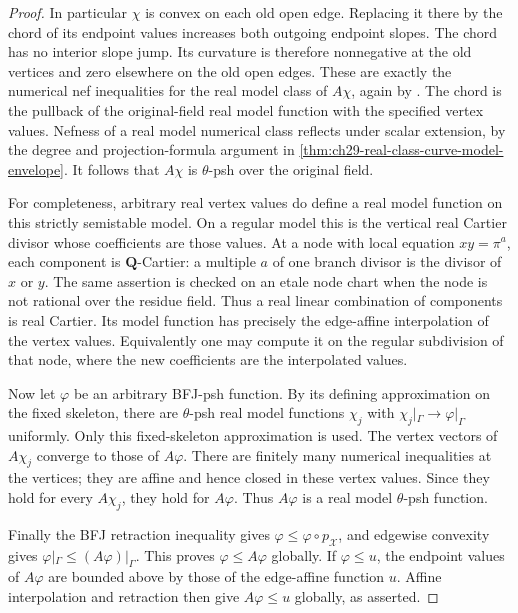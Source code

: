 \begin{proof}
In particular \(\chi\) is convex on each old open edge.  Replacing
it there by the chord of its endpoint values increases both outgoing
endpoint slopes.  The chord has no interior slope jump.  Its
curvature is therefore nonnegative at the old vertices and zero
elsewhere on the old open edges.  These are exactly the numerical
nef inequalities for the real model class of \(A\chi\), again by
\cite[Proposition~3.7]{GJKM19}.  The chord is the pullback of the
original-field real model function with the specified vertex values.
Nefness of a real model numerical class reflects under scalar
extension, by the degree and projection-formula argument in
\cref{thm:ch29-real-class-curve-model-envelope}.  It follows that
\(A\chi\) is \(\theta\)-psh over the original field.

For completeness, arbitrary real vertex values do define a real
model function on this strictly semistable model.  On a regular
model this is the vertical real Cartier divisor whose coefficients
are those values.  At a node with local equation \(xy=\pi^a\),
each component is \(\mathbf Q\)-Cartier: a multiple \(a\) of
one branch divisor is the divisor of \(x\) or \(y\).
The same assertion is checked on an etale node chart when the node
is not rational over the residue field.  Thus a real linear
combination of components is real Cartier.  Its model function
has precisely the edge-affine interpolation of the vertex values.
Equivalently one may compute it on the regular subdivision of that
node, where the new coefficients are the interpolated values.

Now let \(\varphi\) be an arbitrary BFJ-psh function.  By its
defining approximation on the fixed skeleton, there are
\(\theta\)-psh real model functions \(\chi_j\) with
\(\chi_j|_\Gamma\to\varphi|_\Gamma\) uniformly.  Only this
fixed-skeleton approximation is used.  The vertex vectors of
\(A\chi_j\) converge to those of \(A\varphi\).
There are finitely many numerical inequalities at the vertices;
they are affine and hence closed in these vertex values.  Since
they hold for every \(A\chi_j\), they hold for \(A\varphi\).
Thus \(A\varphi\) is a real model \(\theta\)-psh function.

Finally the BFJ retraction inequality gives
\(\varphi\leq\varphi\circ p_{\mathcal X}\), and edgewise
convexity gives \(\varphi|_\Gamma\leq(A\varphi)|_\Gamma\).
This proves \(\varphi\leq A\varphi\) globally.  If
\(\varphi\leq u\), the endpoint values of \(A\varphi\) are
bounded above by those of the edge-affine function \(u\).
Affine interpolation and retraction then give \(A\varphi\leq u\)
globally, as asserted.
\end{proof}
